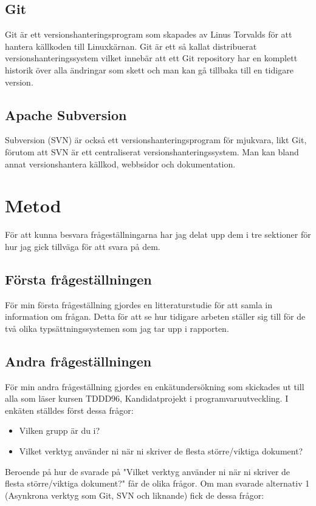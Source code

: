 \subsection{Git}
Git är ett versionshanteringsprogram som skapades av Linus Torvalds för att hantera källkoden till Linuxkärnan. Git är ett så kallat distribuerat versionshanteringssystem vilket innebär att ett Git repository har en komplett historik över alla ändringar som skett och man kan gå tillbaka till en tidigare version.

\subsection{Apache Subversion}
Subversion (SVN) är också ett versionshanteringsprogram för mjukvara, likt Git, förutom att SVN är ett centraliserat versionshanteringssystem. Man kan bland annat versionshantera källkod, webbsidor och dokumentation. 

\section{Metod}
\label{sec:method-tuhkala}
För att kunna besvara frågeställningarna har jag delat upp dem i tre sektioner för hur jag gick tillväga för att svara på dem.

\subsection{Första frågeställningen}
För min första frågeställning gjordes en litteraturstudie för att samla in information om frågan. Detta för att se hur tidigare arbeten ställer sig till för de två olika typsättningssystemen som jag tar upp i rapporten.

\subsection{Andra frågeställningen}
För min andra frågeställning gjordes en enkätundersökning som skickades ut till alla som läser kursen TDDD96, Kandidatprojekt i programvaruutveckling. I enkäten ställdes först dessa frågor:
\begin{itemize}
	\item Vilken grupp är du i?
	\item Vilket verktyg använder ni när ni skriver de flesta större/viktiga dokument?
\end{itemize}

Beroende på hur de svarade på "Vilket verktyg använder ni när ni skriver de flesta större/viktiga dokument?" får de olika frågor. Om man svarade alternativ 1 (Asynkrona verktyg som Git, SVN och liknande) fick de dessa frågor:

